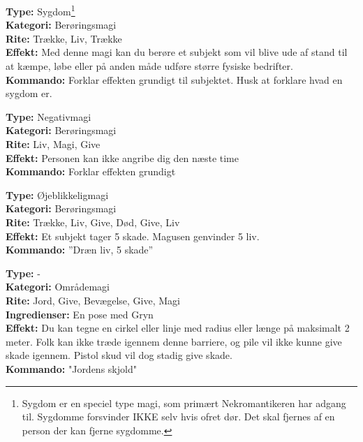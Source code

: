 \begin{lærmagi*}[Spedalsk]
\textbf{Type:} Sygdom\footnote{Sygdom er en speciel type magi, som primært Nekromantikeren har adgang til. Sygdomme forsvinder IKKE selv hvis ofret dør. Det skal fjernes af en person der kan fjerne sygdomme.}\\
\textbf{Kategori:} Berøringsmagi\\
\textbf{Rite:} Trække, Liv, Trække\\
\textbf{Effekt:} Med denne magi kan du berøre et subjekt som vil blive ude af stand til at kæmpe, løbe eller på anden måde udføre større fysiske bedrifter.\\
\textbf{Kommando:} Forklar effekten grundigt til subjektet. Husk at forklare hvad en sygdom er.\\
\end{lærmagi*}

\begin{lærmagi*}[Fred]
\textbf{Type:} Negativmagi\\
\textbf{Kategori:} Berøringsmagi\\
\textbf{Rite:} Liv, Magi, Give\\
\textbf{Effekt:} Personen kan ikke angribe dig den næste time\\
\textbf{Kommando:} Forklar effekten grundigt\\
\end{lærmagi*}

\begin{lærmagi*}
\textbf{Type:} Øjeblikkeligmagi\\
\textbf{Kategori:} Berøringsmagi\\
\textbf{Rite:} Trække, Liv, Give, Død, Give, Liv\\
\textbf{Effekt:} Et subjekt tager 5 skade. Magusen genvinder 5 liv.\\
\textbf{Kommando:} ”Dræn liv, 5 skade”\\
\end{lærmagi*}

\begin{lærmagi*}
\textbf{Type:} -\\
\textbf{Kategori:} Områdemagi\\
\textbf{Rite:} Jord, Give, Bevægelse, Give, Magi\\
\textbf{Ingredienser:} En pose med Gryn\\
\textbf{Effekt:} Du kan tegne en cirkel eller linje med radius eller længe på maksimalt 2 meter. Folk kan ikke træde igennem denne barriere, og pile vil ikke kunne give skade igennem. Pistol skud vil dog stadig give skade.\\
\textbf{Kommando:} "Jordens skjold"\\
\end{lærmagi*}


